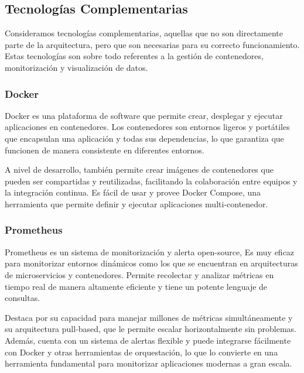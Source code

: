\subsection{Tecnologías Complementarias}

Consideramos tecnologías complementarias, aquellas que no son directamente parte de la arquitectura, pero que son necesarias para su correcto funcionamiento.\newline
Estas tecnologías son sobre todo referentes a la gestión de contenedores, monitorización y visualización de datos.

\subsubsection{Docker}

Docker es una plataforma de software que permite crear, desplegar y ejecutar aplicaciones en contenedores. 
Los contenedores son entornos ligeros y portátiles que encapsulan una aplicación y todas sus dependencias, lo que garantiza que funcionen de manera consistente en diferentes entornos.\newline

A nivel de desarrollo, también permite crear imágenes de contenedores que pueden ser compartidas y reutilizadas, facilitando la colaboración entre equipos y la integración continua.
Es fácil de usar y provee Docker Compose, una herramienta que permite definir y ejecutar aplicaciones multi-contenedor.

\subsubsection{Prometheus}
Prometheus es un sistema de monitorización y alerta open-source, Es muy eficaz para monitorizar entornos dinámicos como los que se encuentran en arquitecturas de microservicios y contenedores.
Permite recolectar y analizar métricas en tiempo real de manera altamente eficiente y tiene un potente lenguaje de consultas. \newline

Destaca por su capacidad para manejar millones de métricas simultáneamente y su arquitectura pull-based, que le permite escalar horizontalmente sin problemas. 
Además, cuenta con un sistema de alertas flexible y puede integrarse fácilmente con Docker y otras herramientas de orquestación, 
lo que lo convierte en una herramienta fundamental para monitorizar aplicaciones modernas a gran escala.

\newpage

